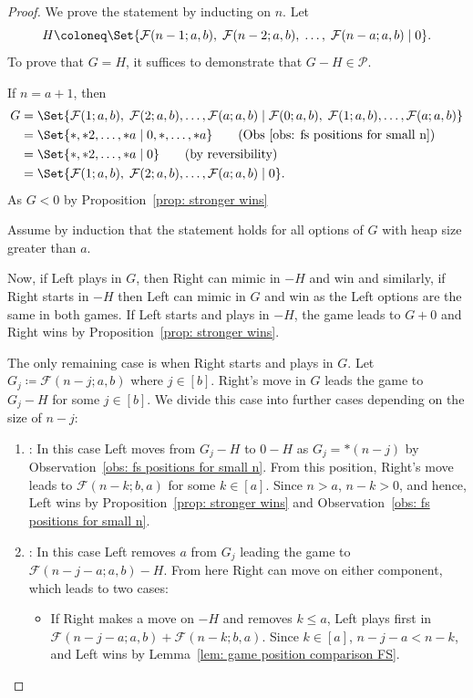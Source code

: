 \documentclass[oneside,reqno]{amsart}
\newcommand{\fs}{\mathcal{F}}
\begin{document}
\begin{proof}
    We prove the statement by inducting on $n$. Let \[ H \coloneq\Set{\fs(n-1;a,b),\; \fs(n-2;a,b),\; \dots,\; \fs(n-a;a,b) \mid 0}.\] To prove that $G=H$, it suffices to  demonstrate that \( G - H \in \mathscr{P}\).

    
    If $n=a+1$, then
    \begin{align*}
        G &= \Set{\fs(1;a,b),\;\fs(2;a,b),\dots,\fs(a;a,b) \mid  \fs(0;a,b),\;\fs(1;a,b),\dots,\fs(a;a,b)}\\ 
        &=\Set{*,*2,\dots,*a\mid 0,*,\dots,*a} \tag{Obs~\ref{obs: fs positions for small n}}\\
        &=\Set{*,*2,\dots,*a\mid 0} \tag{by reversibility}\\
        &=\Set{\fs(1;a,b), \;\fs(2;a,b), \dots, \fs(a;a,b)\mid0}.
    \end{align*}
    As $G<0$ by Proposition~\ref{prop: stronger wins}

    Assume by induction that the statement holds for all options of $G$ with heap size greater than $a$.
    
    Now, if Left plays in $G$, then Right can mimic in $-H$ and win and similarly, if Right starts in $-H$ then Left can mimic in $G$ and win as the Left options are the same in both games. If Left starts and plays in $-H$, the game leads to $G+0$ and Right wins by Proposition~\ref{prop: stronger wins}.
    
    The only remaining case is when Right starts and plays in $G$. Let $G_j\coloneq\fs(n-j;a,b)$ where $j\in[b]$. Right's move in $G$ leads the game to $G_j-H$ for some $j\in[b]$. We divide this case into further cases depending on the size of $n-j$:

    \begin{enumerate}
        \item {}: In this case Left moves from $G_j-H$ to $0-H$ as $G_j=*(n-j)$ by Observation~\ref{obs: fs positions for small n}. From this position, Right's move leads to $\fs(n-k;b,a)$ for some $k\in[a]$. Since $n>a$, $n-k>0$, and hence, Left wins by Proposition~\ref{prop: stronger wins} and Observation~\ref{obs: fs positions for small n}.

        \item {}: In this case Left removes $a$ from $G_j$ leading the game to $\fs(n-j-a;a,b)-H$. From here Right can move on either component, which leads to two cases:
        \begin{itemize}
            \item If Right makes a move on $-H$ and removes $k\le a$, Left plays first in $\fs(n-j-a;a,b)+\fs(n-k;b,a)$. Since $k\in[a]$, $n-j-a<n-k$, and Left wins by Lemma~\ref{lem: game position comparison FS}.


\end{itemize}
\end{enumerate}
\end{proof}
\end{document}
